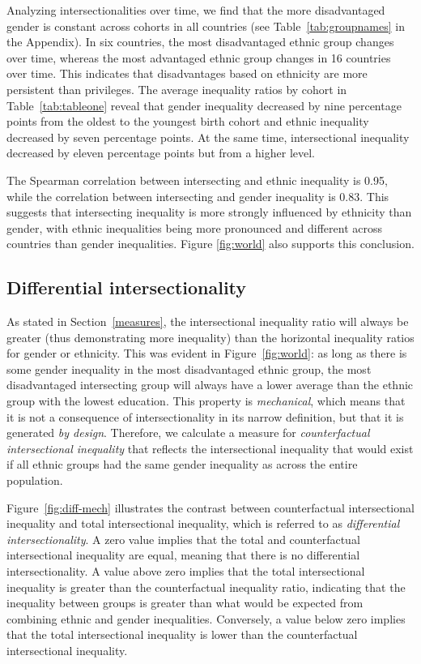 Analyzing intersectionalities over time, we find that the more disadvantaged gender is constant across cohorts in all countries (see Table~\ref{tab:groupnames} in the Appendix). In six countries, the most disadvantaged ethnic group changes over time, whereas the most advantaged ethnic group changes in 16 countries over time. This indicates that disadvantages based on ethnicity are more persistent than privileges. The average inequality ratios by cohort in Table~\ref{tab:tableone} reveal that gender inequality decreased by nine percentage points from the oldest to the youngest birth cohort and ethnic inequality decreased by seven percentage points. At the same time, intersectional inequality decreased by eleven percentage points but from a higher level.

The Spearman correlation between intersecting and ethnic inequality is 0.95, while the correlation between intersecting and gender inequality is 0.83. This suggests that intersecting inequality is more strongly influenced by ethnicity than gender, with ethnic inequalities being more pronounced and different across countries than gender inequalities. Figure \ref{fig:world} also supports this conclusion.

\hypertarget{differential-intersectionality}{%
\subsection{Differential intersectionality}\label{differential-intersectionality}}

As stated in Section~\ref{measures}, the intersectional inequality ratio will always be greater (thus demonstrating more inequality) than the horizontal inequality ratios for gender or ethnicity. This was evident in Figure~\ref{fig:world}: as long as there is some gender inequality in the most disadvantaged ethnic group, the most disadvantaged intersecting group will always have a lower average than the ethnic group with the lowest education. This property is \emph{mechanical}, which means that it is not a consequence of intersectionality in its narrow definition, but that it is generated \textit{by design}. Therefore, we calculate a measure for \emph{counterfactual intersectional inequality} that reflects the intersectional inequality that would exist if all ethnic groups had the same gender inequality as across the entire population.

Figure~\ref{fig:diff-mech} illustrates the contrast between counterfactual intersectional inequality and total intersectional inequality, which is referred to as \emph{differential intersectionality}. A zero value implies that the total and counterfactual intersectional inequality are equal, meaning that there is no differential intersectionality. A value above zero implies that the total intersectional inequality is greater than the counterfactual inequality ratio, indicating that the inequality between groups is greater than what would be expected from combining ethnic and gender inequalities. Conversely, a value below zero implies that the total intersectional inequality is lower than the counterfactual intersectional inequality.

